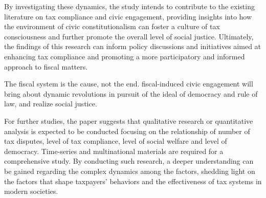 \documentclass[]{article}
\begin{document}
By investigating these dynamics, the study intends to contribute to the existing literature on tax compliance and civic engagement, providing insights into how the environment of civic constitutionalism can foster a culture of tax consciousness and further promote the overall level of social justice. Ultimately, the findings of this research can inform policy discussions and initiatives aimed at enhancing tax compliance and promoting a more participatory and informed approach to fiscal matters.



The fiscal system is the cause, not the end. fiscal-induced civic engagement will bring about dynamic revolutions in pursuit of the ideal of democracy and rule of law, and realize social justice.

For further studies, the paper suggests that qualitative research or quantitative analysis is expected to be conducted focusing on the relationship of number of tax disputes, level of tax compliance, level of social welfare and level of democracy. Time-series and multinational materials are required for a comprehensive study. By conducting such research, a deeper understanding can be gained regarding the complex dynamics among the factors, shedding light on the factors that shape taxpayers' behaviors and the effectiveness of tax systems in modern societies.






\pagebreak


\sloppy

\printbibliography
\end{document}
